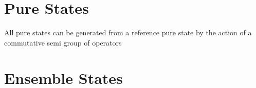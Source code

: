 \documentclass[aps,preprint]{revtex4}%
\begin{document}
\section{Pure States \label{pure}}

All pure states can be generated from a reference pure state by the action of
a commutative semi group of operators

\section{Ensemble States \label{mixed}}
\end{document}
